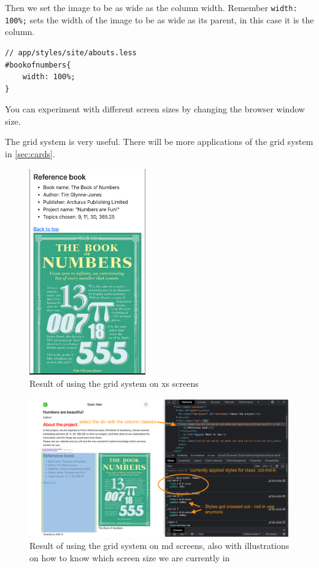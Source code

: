 Then we set the image to be as wide as the column width. Remember \texttt{width: 100\%;} sets the width of the image to be as wide as its parent, in this case it is the column.

\begin{lstlisting}[language=pug]
// app/styles/site/abouts.less
#bookofnumbers{
    width: 100%;
}
\end{lstlisting}

You can experiment with different screen sizes by changing the browser window size.

The grid system is very useful. There will be more applications of the grid system in \cref{sec:cards}.

\begin{figure}[H]
\centering
\includegraphics[width=5cm]{images/chn6-grid-xs.png}
\caption{Result of using the grid system on xs screens}
\end{figure}

\begin{figure}[H]
\centering
\includegraphics[width=15cm]{images/chn6-grid-md.png}
\caption{Result of using the grid system on md screens, also with illustrations on how to know which screen size we are currently in}
\end{figure}

